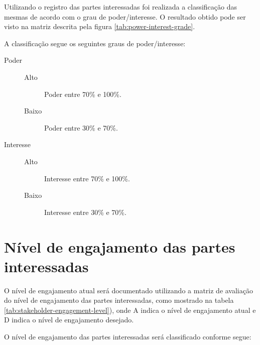 Utilizando o registro das partes interessadas foi realizada a classificação das mesmas de acordo com o grau de poder/interesse. O resultado obtido pode ser visto na matriz descrita pela figura \ref{tab:power-interest-grade}.

A classificação segue os seguintes graus de poder/interesse:

\begin{description}
	\item[Poder] \mbox{}
	\begin{description}
		\item[Alto] Poder entre 70\% e 100\%.
		\item[Baixo] Poder entre 30\% e 70\%.
	\end{description}
	\item[Interesse] \mbox{}
	\begin{description}
		\item[Alto] Interesse entre 70\% e 100\%.
		\item[Baixo] Interesse entre 30\% e 70\%.
	\end{description}
\end{description}




\section{Nível de engajamento das partes interessadas}
\label{sec:stakeholder-engagement}

O nível de engajamento atual será documentado utilizando a matriz de avaliação do nível de engajamento das partes interessadas, como mostrado na tabela \ref{tab:stakeholder-engagement-level}), onde A indica o nível de engajamento atual e D indica o nível de engajamento desejado.

O nível de engajamento das partes interessadas será classificado conforme segue:

